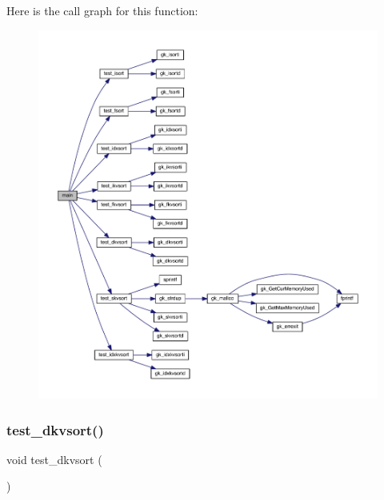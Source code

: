 Here is the call graph for this function\+:\nopagebreak
\begin{figure}[H]
\begin{center}
\leavevmode
\includegraphics[width=350pt]{a00152_ae66f6b31b5ad750f1fe042a706a4e3d4_cgraph}
\end{center}
\end{figure}
\mbox{\label{a00152_a91e0ce6fc88d5ab6695cda68dc4e79b5}} 
\subsubsection{\texorpdfstring{test\+\_\+dkvsort()}{test\_dkvsort()}}
{\footnotesize\ttfamily void test\+\_\+dkvsort (\begin{DoxyParamCaption}{ }\end{DoxyParamCaption})}

